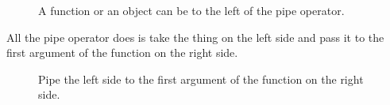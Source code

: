 \documentclass[
  letterpaper,
  DIV=11,
  numbers=noendperiod]{scrreprt}
\begin{document}
\begin{figure}


\caption{\label{fig-left-side}A function or an object can be to the left
of the pipe operator.}

\end{figure}%

All the pipe operator does is take the thing on the left side and pass
it to the first argument of the function on the right side.

\begin{figure}


\caption{\label{fig-pipe}Pipe the left side to the first argument of the
function on the right side.}

\end{figure}%
\end{document}
